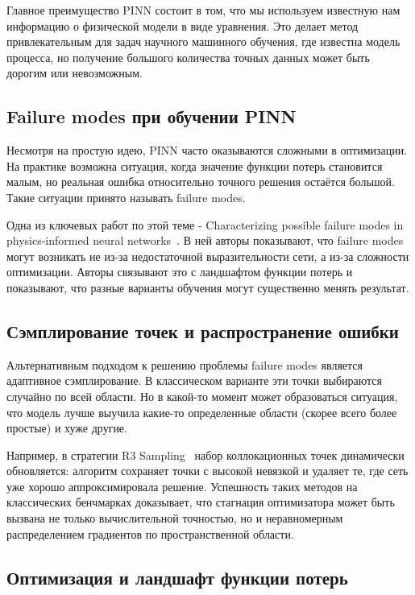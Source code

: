 \documentclass[14pt,a4paper]{extarticle}
\begin{document}
Главное преимущество PINN состоит в том, что мы используем известную нам информацию о физической модели в виде уравнения. Это делает метод привлекательным для задач научного машинного обучения, где известна модель процесса, но получение большого количества точных данных может быть дорогим или невозможным.

\subsection{Failure modes при обучении PINN}

Несмотря на простую идею, PINN часто оказываются сложными в оптимизации. На практике возможна ситуация, когда значение функции потерь становится малым, но реальная ошибка относительно точного решения остаётся большой. Такие ситуации принято называть failure modes.

Одна из ключевых работ по этой теме - Characterizing possible failure modes in physics-informed neural networks~\cite{krishnapriyan2021characterizing}. В ней авторы показывают, что failure modes могут возникать не из-за недостаточной выразительности сети, а из-за сложности оптимизации. Авторы связывают это с ландшафтом функции потерь и показывают, что разные варианты обучения могут существенно менять результат.


\subsection{Сэмплирование точек и распространение ошибки}

Альтернативным подходом к решению проблемы failure modes является адаптивное сэмплирование. В классическом варианте эти точки выбираются случайно по всей области. Но в какой-то момент может образоваться ситуация, что модель лучше выучила какие-то определенные области (скорее всего более простые) и хуже другие.

 Например, в стратегии R3 Sampling~\cite{daw2022r3} набор коллокационных точек динамически обновляется: алгоритм сохраняет точки с высокой невязкой и удаляет те, где сеть уже хорошо аппроксимировала решение. Успешность таких методов на классических бенчмарках доказывает, что стагнация оптимизатора может быть вызвана не только вычислительной точностью, но и неравномерным распределением градиентов по пространственной области.

\subsection{Оптимизация и ландшафт функции потерь}
\end{document}
